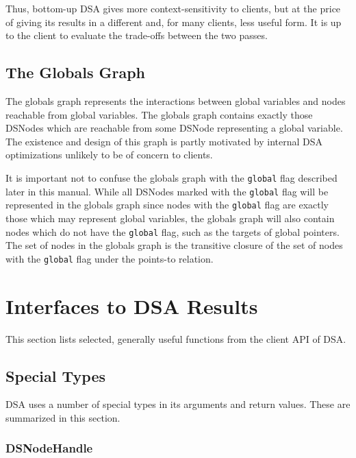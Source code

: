 \documentclass{article}
\begin{document}
Thus, bottom-up DSA gives more context-sensitivity to clients, but at
the price of giving its results in a different and, for many clients,
less useful form.  It is up to the client to evaluate the trade-offs
between the two passes.

\subsection{The Globals Graph}

The globals graph represents the interactions between global variables
and nodes reachable from global variables.  The globals graph contains
exactly those DSNodes which are reachable from some DSNode
representing a global variable.  The existence and design of this
graph is partly motivated by internal DSA optimizations unlikely to be
of concern to clients.

It is important not to confuse the globals graph with the
\texttt{global} flag described later in this manual.  While all
DSNodes marked with the \texttt{global} flag will be represented in
the globals graph since nodes with the \texttt{global} flag are
exactly those which may represent global variables, the globals graph
will also contain nodes which do not have the \texttt{global} flag,
such as the targets of global pointers.  The set of nodes in the
globals graph is the transitive closure of the set of nodes with the
\texttt{global} flag under the points-to relation.

\section{Interfaces to DSA Results}


This section lists selected, generally useful functions from the
client API of DSA.

\subsection{Special Types}

DSA uses a number of special types in its arguments and return
values.  These are summarized in this section.

\subsubsection{DSNodeHandle}
\end{document}
